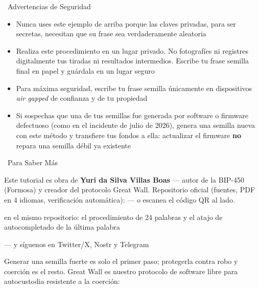 \documentclass[10pt]{article}
\begin{document}
\begin{warnbox}{\faExclamationTriangle~Advertencias de Seguridad}
\begin{itemize}[itemsep=1pt]
 \item Nunca uses este ejemplo de arriba porque las claves privadas, para ser secretas, necesitan que su frase sea verdaderamente aleatoria
 \item Realiza este procedimiento en un lugar privado. No fotografíes ni registres digitalmente tus tiradas ni resultados intermedios. Escribe tu frase semilla final en papel y guárdala en un lugar seguro
 \item Para máxima seguridad, escribe tu frase semilla únicamente en dispositivos \textit{air gapped} de confianza y de tu propiedad
 \item Si sospechas que una de tus semillas fue generada por software o firmware defectuoso (como en el incidente de julio de 2026), genera una semilla nueva con este método y transfiere tus fondos a ella: actualizar el firmware \textbf{no} repara una semilla débil ya existente
\end{itemize}
\end{warnbox}

\begin{infobox}{\faInfoCircle~Para Saber Más}
\begin{minipage}[c]{0.8\textwidth}
Este tutorial es obra de \textbf{Yuri da Silva Villas Boas} --- autor de la BIP-450 (Formosa) y creador del protocolo Great Wall. Repositorio oficial (fuentes, PDF en 4 idiomas, verificación automática): \repolink --- o escanea el código QR al lado.

\begin{description}[itemsep=1pt]
 \item [Edición extendida --- 24 palabras:] en el mismo repositorio: el procedimiento de 24 palabras y el atajo de autocompletado de la última palabra
 \item [Más tutoriales, cursos y comunidad:] \sitelink --- y síguenos en Twitter/X, Nostr y Telegram
 \item [Great Wall:] Generar una semilla fuerte es solo el primer paso; protegerla contra robo y coerción es el resto. Great Wall es nuestro protocolo de software libre para autocustodia resistente a la coerción: \gwlink
\end{description}

\end{minipage}%
\hfill
\begin{minipage}[c]{0.15\textwidth}
\centering
\repoqr
\end{minipage}
\end{infobox}

\end{document}
